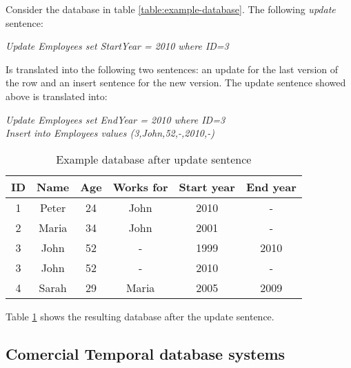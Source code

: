 \begin{example}
Consider the database in table \ref{table:example-database}. The following \emph{update} sentence:

\begin{center}
\emph{Update Employees set StartYear = 2010 where ID=3}
\end{center}

Is translated into the following two sentences: an update for the last version of the row and an insert sentence for the new version. The update sentence showed above is translated into:

\begin{center}
\emph{Update Employees set EndYear = 2010 where ID=3}\\
\emph{Insert into Employees values (3,John,52,-,2010,-)}
\end{center}


\begin{table}
\centering
\caption{Example database after update sentence}
\begin{tabular}{c c c c c c }
\hline
\textbf{ID} & \textbf{Name} & \textbf{Age} & \textbf{Works for} & \textbf{Start year} & \textbf{End year} \\ \hline
1 & Peter & 24 & John &  2010 & - \\
2 & Maria & 34 & John & 2001 & - \\
3 & John & 52 & - &  1999 & 2010 \\
3 & John & 52 & - &  2010 & - \\
4 & Sarah & 29 & Maria &  2005 & 2009 \\
\hline 
\end{tabular}
\label{table:example-database-update}



\end{table}


Table \ref{table:example-database-update} shows the resulting database after the update sentence.

\end{example}


\subsection{Comercial Temporal database systems}



